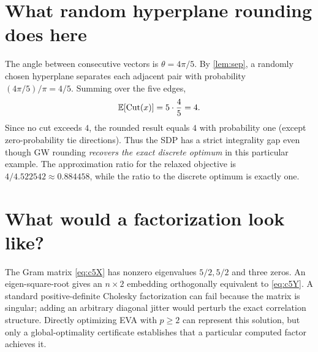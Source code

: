 \section{What random hyperplane rounding does here}
The angle between consecutive vectors is $\theta=4\pi/5$. By \cref{lem:sep}, a randomly chosen hyperplane separates each adjacent pair with probability $(4\pi/5)/\pi=4/5$. Summing over the five edges,
\[
\mathbb{E}[\operatorname{Cut}(x)]=5\cdot\frac45=4.
\]
Since no cut exceeds $4$, the rounded result equals $4$ with probability one (except zero-probability tie directions). Thus the SDP has a strict integrality gap even though GW rounding \emph{recovers the exact discrete optimum} in this particular example. The approximation ratio for the relaxed objective is $4/4.522542\approx0.884458$, while the ratio to the discrete optimum is exactly one.

\section{What would a factorization look like?}
The Gram matrix \eqref{eq:c5X} has nonzero eigenvalues $5/2,5/2$ and three zeros. An eigen-square-root gives an $n\times2$ embedding orthogonally equivalent to \eqref{eq:c5Y}. A standard positive-definite Cholesky factorization can fail because the matrix is singular; adding an arbitrary diagonal jitter would perturb the exact correlation structure. Directly optimizing EVA with $p\ge2$ can represent this solution, but only a global-optimality certificate establishes that a particular computed factor achieves it.
